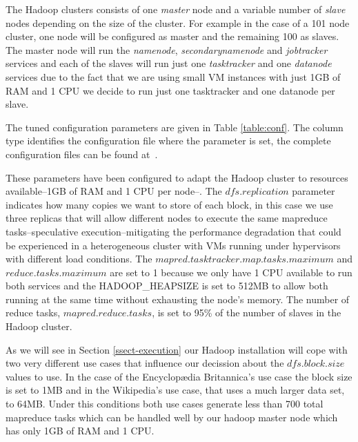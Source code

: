 The Hadoop clusters consists of one \emph{master} node and a variable number of \emph{slave} nodes depending on the size of the cluster. For example in the case of a 101 node cluster, one node will be configured as master and the remaining 100 as slaves. The master node will run the \emph{namenode}, \emph{secondarynamenode} and \emph{jobtracker} services and each of the slaves will run just one \emph{tasktracker} and one \emph{datanode} services
due to the fact that we are using small VM instances with just 1GB of RAM and 1 CPU we decide to run just one tasktracker and one datanode per slave. 

The tuned configuration parameters are given in Table \ref{table:conf}. The column type identifies the configuration file where the parameter is set, the complete configuration files can be found at~\cite{scripts}.

These parameters have been configured to adapt the Hadoop cluster to resources available--1GB of RAM and 1 CPU per node--. The $dfs.replication$ parameter indicates how many copies we want to store of each block, in this case we use three replicas that will allow different nodes to execute the same mapreduce tasks--speculative execution--mitigating the performance degradation that could be experienced in a heterogeneous cluster with VMs running under hypervisors with different load conditions. The $mapred.tasktracker.map.tasks.maximum$ and $reduce.tasks.maximum$ are set to 1 because we only have 1 CPU available to run both services and the HADOOP\_HEAPSIZE is set to 512MB to allow both running at the same time without exhausting the node's memory. The number of reduce tasks, $mapred.reduce.tasks$, is set to 95\% of the number of slaves in the Hadoop cluster. 

As we will see in Section \ref{ssect-execution} our Hadoop installation will cope with two very different use cases that influence our decission about the $dfs.block.size$ values to use. In the case of the Encyclop{\ae}dia Britannica's use case the block size is set to 1MB and in the Wikipedia's use case, that uses a much larger data set, to 64MB. Under this conditions both use cases generate less than 700 total mapreduce tasks which can be handled well by our hadoop master node which has only 1GB of RAM and 1 CPU.


